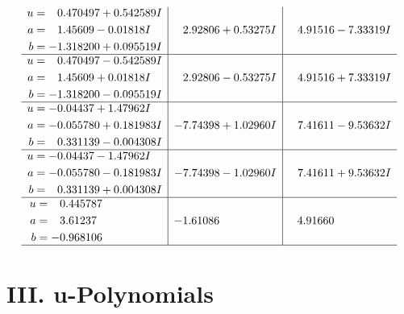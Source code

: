 \documentclass[1p]{elsarticle_modified}
\theoremstyle{definition}
\begin{document}
$$\begin{array}{c|c|c}
\begin{aligned}
u &= \phantom{-}0.470497 + 0.542589 I \\
a &= \phantom{-}1.45609 - 0.01818 I \\
b &= -1.318200 + 0.095519 I\end{aligned}
 & \phantom{-}2.92806 + 0.53275 I & \phantom{-}4.91516 - 7.33319 I \\ \hline\begin{aligned}
u &= \phantom{-}0.470497 - 0.542589 I \\
a &= \phantom{-}1.45609 + 0.01818 I \\
b &= -1.318200 - 0.095519 I\end{aligned}
 & \phantom{-}2.92806 - 0.53275 I & \phantom{-}4.91516 + 7.33319 I \\ \hline\begin{aligned}
u &= -0.04437 + 1.47962 I \\
a &= -0.055780 + 0.181983 I \\
b &= \phantom{-}0.331139 - 0.004308 I\end{aligned}
 & -7.74398 + 1.02960 I & \phantom{-}7.41611 - 9.53632 I \\ \hline\begin{aligned}
u &= -0.04437 - 1.47962 I \\
a &= -0.055780 - 0.181983 I \\
b &= \phantom{-}0.331139 + 0.004308 I\end{aligned}
 & -7.74398 - 1.02960 I & \phantom{-}7.41611 + 9.53632 I \\ \hline\begin{aligned}
u &= \phantom{-}0.445787\phantom{ +0.000000I} \\
a &= \phantom{-}3.61237\phantom{ +0.000000I} \\
b &= -0.968106\phantom{ +0.000000I}\end{aligned}
 & -1.61086\phantom{ +0.000000I} & \phantom{-}4.91660\phantom{ +0.000000I}\\
 \hline 
 \end{array}$$\newpage
\newpage\renewcommand{\arraystretch}{1}
\centering \section*{ III. u-Polynomials}
\end{document}
